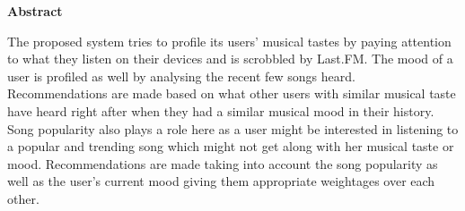 \cleardoublepage

\begin{center}
	\huge{\textbf{Abstract}}
\end{center}

The proposed system tries to profile its users' musical tastes by paying attention to what they listen on their devices and is scrobbled by Last.FM. The mood of a user is profiled as well by analysing the recent few songs heard. Recommendations are made based on what other users with similar musical taste have heard right after when they had a similar musical mood in their history. Song popularity also plays a role here as a user might be interested in listening to a popular and trending song which might not get along with her musical taste or mood. Recommendations are made taking into account the song popularity as well as the user's current mood giving them appropriate weightages over each other.